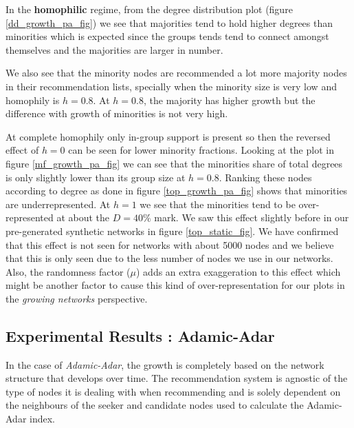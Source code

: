 In the \textbf{homophilic} regime, from the degree distribution plot (figure \ref{dd_growth_pa_fig}) we see that majorities tend to hold higher degrees than minorities which is expected since the groups tends tend to connect amongst themselves and the majorities are larger in number.

We also see that the minority nodes are recommended a lot more majority nodes in their recommendation lists, specially when the minority size is very low and homophily is $h=0.8$. At $h=0.8$, the majority has higher growth but the difference with growth of minorities is not very high.

At complete homophily only in-group support is present so then the reversed effect of $h=0$ can be seen for lower minority fractions. Looking at the plot in figure \ref{mf_growth_pa_fig} we can see that the minorities share of total degrees is only slightly lower than its group size at $h=0.8$. Ranking these nodes according to degree as done in figure \ref{top_growth_pa_fig} shows that minorities are underrepresented. At $h=1$ we see that the minorities tend to be over-represented at about the $D=40\%$ mark. We saw this effect slightly before in our pre-generated synthetic networks in figure \ref{top_static_fig}. We have confirmed that this effect is not seen for networks with about 5000 nodes and we believe that this is only seen due to the less number of nodes we use in our networks. Also, the randomness factor ($\mu$) adds an extra exaggeration to this effect which might be another factor to cause this kind of over-representation for our plots in the \textit{growing networks} perspective.

\subsection{Experimental Results : Adamic-Adar}

In the case of \textit{Adamic-Adar}, the growth is completely based on the network structure that develops over time. The recommendation system is agnostic of the type of nodes it is dealing with when recommending and is solely dependent on the neighbours of the seeker and candidate nodes used to calculate the Adamic-Adar index. 

